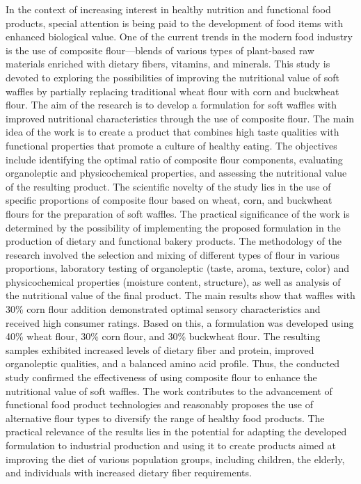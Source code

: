 In the context of increasing interest in healthy nutrition and
functional food products, special attention is being paid to the
development of food items with enhanced biological value. One of the
current trends in the modern food industry is the use of composite
flour---blends of various types of plant-based raw materials enriched
with dietary fibers, vitamins, and minerals. This study is devoted to
exploring the possibilities of improving the nutritional value of soft
waffles by partially replacing traditional wheat flour with corn and
buckwheat flour. The aim of the research is to develop a formulation for
soft waffles with improved nutritional characteristics through the use
of composite flour. The main idea of the work is to create a product
that combines high taste qualities with functional properties that
promote a culture of healthy eating. The objectives include identifying
the optimal ratio of composite flour components, evaluating organoleptic
and physicochemical properties, and assessing the nutritional value of
the resulting product. The scientific novelty of the study lies in the
use of specific proportions of composite flour based on wheat, corn, and
buckwheat flours for the preparation of soft waffles. The practical
significance of the work is determined by the possibility of
implementing the proposed formulation in the production of dietary and
functional bakery products. The methodology of the research involved the
selection and mixing of different types of flour in various proportions,
laboratory testing of organoleptic (taste, aroma, texture, color) and
physicochemical properties (moisture content, structure), as well as
analysis of the nutritional value of the final product. The main results
show that waffles with 30\% corn flour addition demonstrated optimal
sensory characteristics and received high consumer ratings. Based on
this, a formulation was developed using 40\% wheat flour, 30\% corn
flour, and 30\% buckwheat flour. The resulting samples exhibited
increased levels of dietary fiber and protein, improved organoleptic
qualities, and a balanced amino acid profile. Thus, the conducted study
confirmed the effectiveness of using composite flour to enhance the
nutritional value of soft waffles. The work contributes to the
advancement of functional food product technologies and reasonably
proposes the use of alternative flour types to diversify the range of
healthy food products. The practical relevance of the results lies in
the potential for adapting the developed formulation to industrial
production and using it to create products aimed at improving the diet
of various population groups, including children, the elderly, and
individuals with increased dietary fiber requirements.

